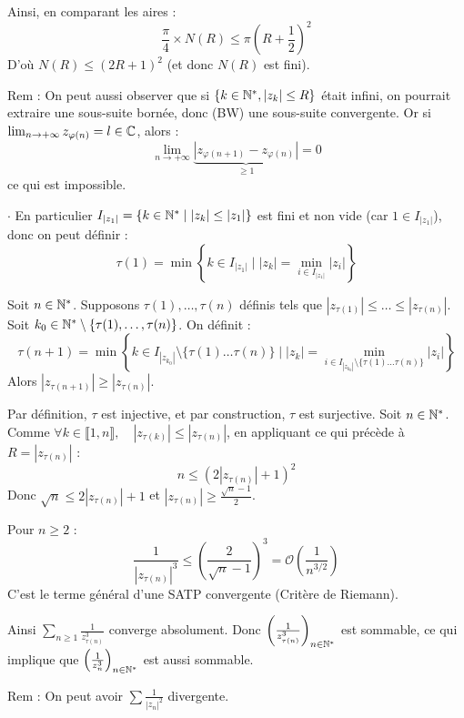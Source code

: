 \begin{solution}
Ainsi, en comparant les aires :
\[ \frac{\pi}{4} \times N(R) \leq \pi \left(R+\frac{1}{2}\right)^2 \]
D'où $N(R) \leq (2R+1)^2$ (et donc $N(R)$ est fini).

\begin{remarkbox}
Rem : On peut aussi observer que si $\{k \in \mathbb N^*, |z_k| \leq R\}$ était infini, on pourrait extraire une sous-suite bornée, donc (BW) une sous-suite convergente. Or si $\lim_{n \to +\infty} z_{\varphi(n)} = l \in \mathbb C$, alors :
\[ \lim_{n \to +\infty} \underbrace{|z_{\varphi(n+1)} - z_{\varphi(n)}|}_{\geq 1} = 0 \]
ce qui est impossible.
\end{remarkbox}

$\cdot$ En particulier $I_{|z_1|} = \{k \in \mathbb N^* \mid |z_k| \leq |z_1|\}$ est fini et non vide (car $1 \in I_{|z_1|}$), donc on peut définir :
\[ \tau(1) = \min \left\{ k \in I_{|z_1|} \mid |z_k| = \min_{i \in I_{|z_1|}} |z_i| \right\} \]

Soit $n \in \mathbb N^*$. Supposons $\tau(1), \dots, \tau(n)$ définis tels que $|z_{\tau(1)}| \leq \dots \leq |z_{\tau(n)}|$.
Soit $k_0 \in \mathbb N^* \setminus \{\tau(1), \dots, \tau(n)\}$. On définit :
\[ \tau(n+1) = \min \left\{ k \in I_{|z_{k_0}|} \setminus \{\tau(1)\dots\tau(n)\} \mid |z_k| = \min_{i \in I_{|z_{k_0}|} \setminus \{\tau(1)\dots\tau(n)\}} |z_i| \right\} \]
Alors $|z_{\tau(n+1)}| \geq |z_{\tau(n)}|$.

Par définition, $\tau$ est injective, et par construction, $\tau$ est surjective.
Soit $n \in \mathbb N^*$. Comme $\forall k \in \llbracket 1, n \rrbracket, \quad |z_{\tau(k)}| \leq |z_{\tau(n)}|$, en appliquant ce qui précède à $R = |z_{\tau(n)}|$ :
\[ n \leq (2|z_{\tau(n)}|+1)^2 \]
Donc $\sqrt{n} \leq 2|z_{\tau(n)}| + 1$ et $|z_{\tau(n)}| \geq \frac{\sqrt{n}-1}{2}$.

Pour $n \geq 2$ :
\[ \frac{1}{|z_{\tau(n)}|^3} \leq \left( \frac{2}{\sqrt{n}-1} \right)^3 = \mathcal{O}\left(\frac{1}{n^{3/2}}\right) \]
C'est le terme général d'une SATP convergente (Critère de Riemann).

Ainsi $\sum_{n \geq 1} \frac{1}{z_{\tau(n)}^3}$ converge absolument. Donc $\left( \frac{1}{z_{\tau(n)}^3} \right)_{n \in \mathbb N^*}$ est sommable, ce qui implique que $\left( \frac{1}{z_n^3} \right)_{n \in \mathbb N^*}$ est aussi sommable.

\begin{remarkbox}
Rem : On peut avoir $\sum \frac{1}{|z_n|^2}$ divergente.
\end{remarkbox}
\end{solution}

